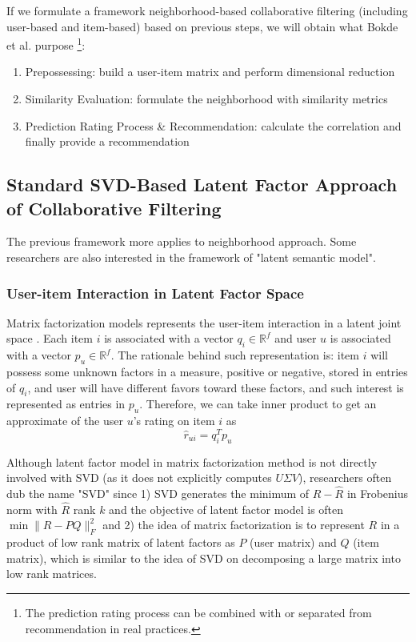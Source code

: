 \documentclass[letter paper, 11pt]{article}
\begin{document}
	If we formulate a framework neighborhood-based collaborative filtering (including user-based and item-based) based on previous steps, we will obtain what Bokde et al. purpose \cite{MF-Model-Survey}\footnote{The prediction rating process can be combined with or separated from recommendation in real practices.}:
	
	\begin{enumerate}
		\item Prepossessing:
		build a user-item matrix and perform dimensional reduction
		
		\item Similarity Evaluation:
		formulate the neighborhood with similarity metrics
		
		\item Prediction Rating Process \& Recommendation:
		calculate the correlation and finally provide a recommendation
	\end{enumerate}
	
	\subsection{Standard SVD-Based Latent Factor Approach of Collaborative Filtering} 
	The previous framework more applies to neighborhood approach. Some researchers are also interested in the framework of "latent semantic model". 
	
	\subsubsection{User-item Interaction in Latent Factor Space}
	Matrix factorization models represents the user-item interaction in a latent joint space \cite{MFinRS}. Each item $i$ is associated with a vector $q_i \in \mathbb{R}^f$ and user $u$ is associated with a vector $p_u \in \mathbb{R}^f$. The rationale behind such representation is: item $i$ will possess some unknown factors in a measure, positive or negative, stored in entries of $q_i$, and user will have different favors toward these factors, and such interest is represented as entries in $p_u$. Therefore, we can take inner product to get an approximate of the user $u$'s rating on item $i$ as \cite{MFinRS} 
	\begin{equation}
		\hat{r}_{ui} = q_i^T  p_u 
	\end{equation}
	
	
	Although latent factor model in matrix factorization method is not directly involved with SVD (as it does not explicitly computes $U \Sigma V$), researchers often dub the name "SVD" since 1) SVD generates the minimum of $R - \hat{R}$ in Frobenius norm with $\hat{R}$ rank $k$ and the objective of latent factor model is often $\min \|R - P Q\|_F^2$ and 2) the idea of matrix factorization is to represent $R$ in a product of low rank matrix of latent factors as $P$ (user matrix) and $Q$ (item matrix), which is similar to the idea of SVD on decomposing a large matrix into low rank matrices. 
	
\end{document}
